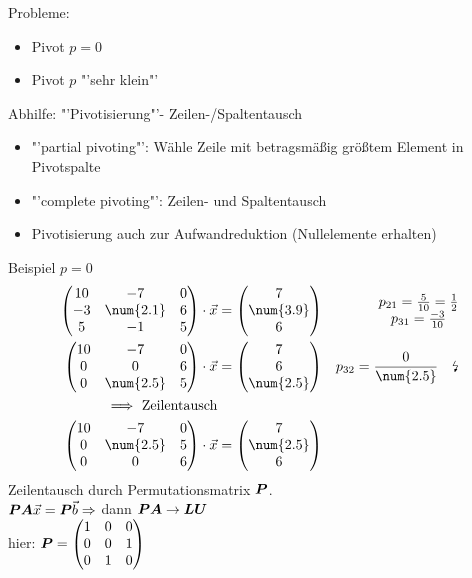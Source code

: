 Probleme:
\begin{itemize}
	\item Pivot $p = 0$ \lightning\lightning 
	\item Pivot $p$ "'sehr klein"'
\end{itemize}
Abhilfe: "'Pivotisierung"'- Zeilen-/Spaltentausch
\begin{itemize}
	\item "'partial pivoting"': Wähle Zeile mit betragsmäßig größtem Element in Pivotspalte
	\item "'complete pivoting"': Zeilen- und Spaltentausch
	\item Pivotisierung auch zur Aufwandreduktion (Nullelemente erhalten)
\end{itemize}

Beispiel $p = 0$
\begin{align}
	\begin{pmatrix}
	10 & -7 & 0 \\ 
	-3 & \num{2.1} & 6 \\ 
	5 & -1 & 5
	\end{pmatrix}\cdot\vec{x} &= \begin{pmatrix}
	7\\ \num{3.9}\\ 6
	\end{pmatrix}& \begin{matrix}
	p_{21} = \frac{5}{10} = \frac{1}{2}\\ p_{31} = \frac{-3}{10}
	\end{matrix}\\
	\begin{pmatrix}
	10 & -7 & 0 \\ 
	0 & 0 & 6 \\ 
	0 & \num{2.5} & 5
	\end{pmatrix}\cdot\vec{x}& = \begin{pmatrix}
	7\\ 6\\ \num{2.5}
	\end{pmatrix}& p_{32} = \frac{0}{\num{2.5}}\quad\text{\lightning}\\
	\Longrightarrow\text{ Zeilentausch}\\
	\begin{pmatrix}
	10 & -7 & 0 \\
	0 & \num{2.5} & 5 \\
	0 & 0 & 6
	\end{pmatrix}\cdot\vec{x}& = \begin{pmatrix}
	7\\ \num{2.5}\\ 6
	\end{pmatrix} 
\end{align}
Zeilentausch durch Permutationsmatrix $\boldsymbol {P}$.\\
$\boldsymbol {P}\boldsymbol {A}\vec{x} = \boldsymbol {P}\vec{b}\Rightarrow$ dann $\boldsymbol {P}\boldsymbol {A}\rightarrow\boldsymbol {L}\boldsymbol {U}$\\
hier: $\boldsymbol {P} = \begin{pmatrix}
1 & 0 & 0\\ 0 & 0 & 1\\ 0 & 1 & 0
\end{pmatrix}$



